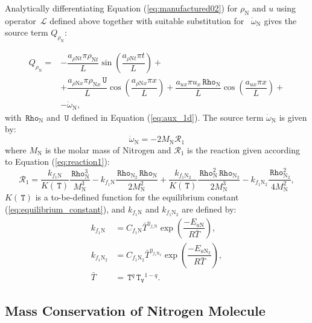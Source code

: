 \documentclass[10pt]{article}
\newcommand{\Lo}{\,\mathcal{L}}
\newcommand{\Rho}{\,\mathtt{Rho}}
\newcommand{\T}{\,\mathtt{T}}
\newcommand{\U}{\,\mathtt{U}}
\newcommand{\TV}{\,\mathtt{T_V}}
\newcommand{\N}{\text{N}}
\begin{document}
Analytically differentiating Equation (\ref{eq:manufactured02}) for $\rho_{\text{N}}$  and $u$ using operator $\Lo$ defined above together with suitable substitution for ~$\dot{\omega}_\text{N}$ gives the source term $Q_{\rho_{\text{N}}}$:



\begin{equation*}
\begin{split}
Q_{\rho_\N} =&-\dfrac{a_{\rho \N t} \pi \rho_{\N t} }{L}\sin\left(\dfrac{a_{\rho \N t} \pi t}{L}\right)+\\	
&+ \dfrac{a_{  \rho \N x } \pi \rho_{\N x} \U }{L}\cos\left(\dfrac{a_{  \rho \N x } \pi x}{L}\right) +\dfrac{a_{ux} \pi u_x \Rho_{\N}}{L} \cos\left(\dfrac{a_{ux} \pi x}{L}\right) +\\
&-\dot{\omega}_\N ,
\end{split}
\end{equation*}
%
with $\Rho_\N$ and $\U$ defined in Equation (\ref{eq:aux_1d}). The source term $\dot{\omega}_\N$ is given by:
$$
\dot{\omega}_\N = -2 M_\N \mathcal{R}_1	
$$
where $M_{\text{N}}$ is the molar mass of Nitrogen and $\mathcal{R}_1$ is the reaction given according to Equation (\ref{eq:reaction1}):
\begin{equation}\label{eq:reaction3}
\mathcal{R}_1= \dfrac{k_{f_1 \N}}{K(\T)} \dfrac{\Rho_{\N}^3}{M_\N^3} - k_{f_1 \N}   \dfrac{\Rho_{\N_2} \Rho_{\N}}{2  M_\N^2}+
\dfrac{k_{f_1 \N_2}}{K(\T)} \dfrac{\Rho_\N^2 \Rho_{\N_2}}{2M_\N^3 }- k_{f_1 \N_2} \dfrac{\Rho_{\N_2}^2}{4 M_\N^2},
\end{equation}
$K(\T)$ is a to-be-defined function for the equilibrium constant (\ref{eq:equilibrium_constant}), and $k_{f_1 \text{N}}$ and $k_{f_1 \text{N}_2}$ are defined by:
\begin{equation*}
 \begin{split}
k_{f_1 \text{N}} &= C_{f_1 \text{N}} \bar{T}^{\eta_{f_1 \text{N}}} \exp\left(\dfrac{-E_{a\text{N}}}{R \bar{T}}\right),\\
k_{f_1 \text{N}_2} &= C_{f_1 \text{N}_2} \bar{T}^{\eta_{f_1 \text{N}_2}} \exp\left(\dfrac{-E_{a\text{N}_2}}{R \bar{T}}\right),\\
\bar{T}&=\T^q \TV^{1-q}.
 \end{split}
\end{equation*}



\subsection{Mass Conservation of Nitrogen Molecule}
\end{document}
